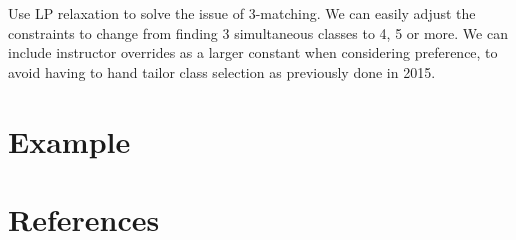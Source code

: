 \documentclass[11pt]{article}
\begin{document}
Use LP relaxation to solve the issue of 3-matching. We can easily adjust the constraints to change from finding 3 simultaneous classes to 4, 5 or more. We can include instructor overrides as a larger constant when considering preference, to avoid having to hand tailor class selection as previously done in 2015.

\section{Example}



\section{References}
\end{document}
